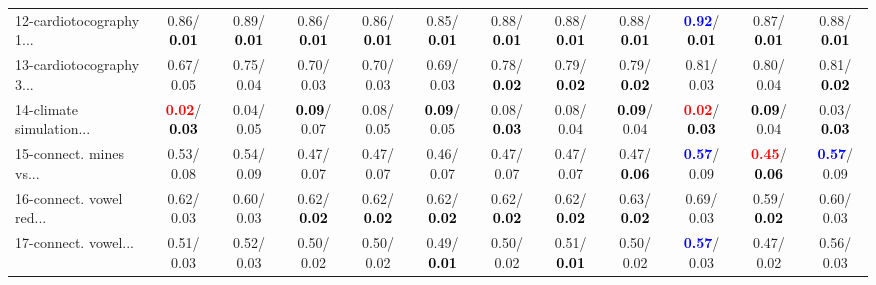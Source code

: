 \begin{table}[h]
\begin{center}
{\begin{tabular}{lc|c|c|c|c|c|c|c|c|c|c}
12-cardiotocography 1... &   0.86/\textcolor{black}{\textbf{  0.01}} &   0.89/\textcolor{black}{\textbf{  0.01}} &   0.86/\textcolor{black}{\textbf{  0.01}} &   0.86/\textcolor{black}{\textbf{  0.01}} &   0.85/\textcolor{black}{\textbf{  0.01}} &   0.88/\textcolor{black}{\textbf{  0.01}} &   0.88/\textcolor{black}{\textbf{  0.01}} &   0.88/\textcolor{black}{\textbf{  0.01}} & \textcolor{blue}{\textbf{  0.92}}/\textcolor{black}{\textbf{  0.01}} &   0.87/\textcolor{black}{\textbf{  0.01}} &   0.88/\textcolor{black}{\textbf{  0.01}} \\
13-cardiotocography 3... &   0.67/  0.05 &   0.75/  0.04 &   0.70/  0.03 &   0.70/  0.03 &   0.69/  0.03 &   0.78/\textcolor{black}{\textbf{  0.02}} &   0.79/\textcolor{black}{\textbf{  0.02}} &   0.79/\textcolor{black}{\textbf{  0.02}} &   0.81/  0.03 &   0.80/  0.04 &   0.81/\textcolor{black}{\textbf{  0.02}} \\
14-climate simulation... & \textcolor{red}{\textbf{  0.02}}/\textcolor{black}{\textbf{  0.03}} &   0.04/  0.05 & \textcolor{black}{\textbf{  0.09}}/  0.07 &   0.08/  0.05 & \textcolor{black}{\textbf{  0.09}}/  0.05 &   0.08/\textcolor{black}{\textbf{  0.03}} &   0.08/  0.04 & \textcolor{black}{\textbf{  0.09}}/  0.04 & \textcolor{red}{\textbf{  0.02}}/\textcolor{black}{\textbf{  0.03}} & \textcolor{black}{\textbf{  0.09}}/  0.04 &   0.03/\textcolor{black}{\textbf{  0.03}} \\ \hline
15-connect. mines vs... &   0.53/  0.08 &   0.54/  0.09 &   0.47/  0.07 &   0.47/  0.07 &   0.46/  0.07 &   0.47/  0.07 &   0.47/  0.07 &   0.47/\textcolor{black}{\textbf{  0.06}} & \textcolor{blue}{\textbf{  0.57}}/  0.09 & \textcolor{red}{\textbf{  0.45}}/\textcolor{black}{\textbf{  0.06}} & \textcolor{blue}{\textbf{  0.57}}/  0.09 \\
16-connect. vowel red... &   0.62/  0.03 &   0.60/  0.03 &   0.62/\textcolor{black}{\textbf{  0.02}} &   0.62/\textcolor{black}{\textbf{  0.02}} &   0.62/\textcolor{black}{\textbf{  0.02}} &   0.62/\textcolor{black}{\textbf{  0.02}} &   0.62/\textcolor{black}{\textbf{  0.02}} &   0.63/\textcolor{black}{\textbf{  0.02}} &   0.69/  0.03 &   0.59/\textcolor{black}{\textbf{  0.02}} &   0.60/  0.03 \\
17-connect. vowel... &   0.51/  0.03 &   0.52/  0.03 &   0.50/  0.02 &   0.50/  0.02 &   0.49/\textcolor{black}{\textbf{  0.01}} &   0.50/  0.02 &   0.51/\textcolor{black}{\textbf{  0.01}} &   0.50/  0.02 & \textcolor{blue}{\textbf{  0.57}}/  0.03 &   0.47/  0.02 &   0.56/  0.03 \\

\end{tabular}}
\end{center}
\end{table}
